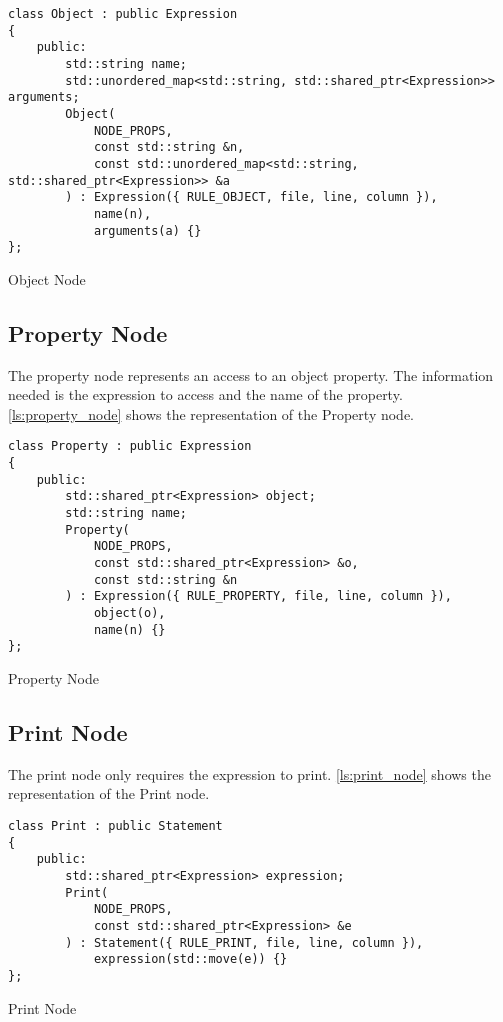 \begin{listing}[H]
\begin{verbatim}
class Object : public Expression
{
    public:
        std::string name;
        std::unordered_map<std::string, std::shared_ptr<Expression>> arguments;
        Object(
            NODE_PROPS,
            const std::string &n,
            const std::unordered_map<std::string, std::shared_ptr<Expression>> &a
        ) : Expression({ RULE_OBJECT, file, line, column }),
            name(n),
            arguments(a) {}
};
\end{verbatim}
\caption{Object Node}
\label{ls:object_node}
\end{listing}

\subsection{Property Node}

The property node represents an access to an object property.
The information needed is the expression to access and the name of the property.
\autoref{ls:property_node} shows the representation of the Property node.

\begin{listing}[H]
\begin{verbatim}
class Property : public Expression
{
    public:
        std::shared_ptr<Expression> object;
        std::string name;
        Property(
            NODE_PROPS,
            const std::shared_ptr<Expression> &o,
            const std::string &n
        ) : Expression({ RULE_PROPERTY, file, line, column }),
            object(o),
            name(n) {}
};
\end{verbatim}
\caption{Property Node}
\label{ls:property_node}
\end{listing}

\subsection{Print Node}

The print node only requires the expression to print.
\autoref{ls:print_node} shows the representation of the Print node.

\begin{listing}[H]
\begin{verbatim}
class Print : public Statement
{
    public:
        std::shared_ptr<Expression> expression;
        Print(
            NODE_PROPS,
            const std::shared_ptr<Expression> &e
        ) : Statement({ RULE_PRINT, file, line, column }),
            expression(std::move(e)) {}
};
\end{verbatim}
\caption{Print Node}
\label{ls:print_node}
\end{listing}

